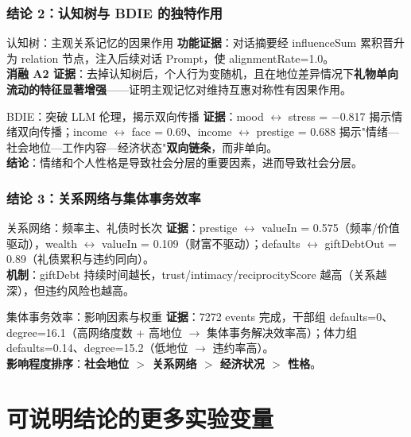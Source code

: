 \documentclass[AutoFakeBold,AutoFakeSlant]{beamer}
\begin{document}
\begin{frame}
    \frametitle{结论 2：认知树与 BDIE 的独特作用}
    \small
    \begin{block}{认知树：主观关系记忆的因果作用}
        \textbf{功能证据}：对话摘要经 influenceSum 累积晋升为 relation 节点，注入后续对话 Prompt，使 alignmentRate=1.0。\\
        \textbf{消融 A2 证据}：去掉认知树后，个人行为变随机，且在地位差异情况下\textbf{礼物单向流动的特征显著增强}——证明主观记忆对维持互惠对称性有因果作用。
    \end{block}
    \begin{block}{BDIE：突破 LLM 伦理，揭示双向传播}
        \textbf{证据}：mood $\leftrightarrow$ stress = $-$0.817 揭示情绪双向传播；income $\leftrightarrow$ face = 0.69、income $\leftrightarrow$ prestige = 0.688 揭示"情绪—社会地位—工作内容—经济状态"\textbf{双向链条}，而非单向。\\
        \textbf{结论}：情绪和个人性格是导致社会分层的重要因素，进而导致社会分层。
    \end{block}
\end{frame}

\begin{frame}
    \frametitle{结论 3：关系网络与集体事务效率}
    \small
    \begin{block}{关系网络：频率主、礼债时长次}
        \textbf{证据}：prestige $\leftrightarrow$ valueIn = 0.575（频率/价值驱动），wealth $\leftrightarrow$ valueIn = 0.109（财富不驱动）；defaults $\leftrightarrow$ giftDebtOut = 0.89（礼债累积与违约同向）。\\
        \textbf{机制}：giftDebt 持续时间越长，trust/intimacy/reciprocityScore 越高（关系越深），但违约风险也越高。
    \end{block}
    \begin{block}{集体事务效率：影响因素与权重}
        \textbf{证据}：7272 events 完成，干部组 defaults=0、degree=16.1（高网络度数 + 高地位 $\to$ 集体事务解决效率高）；体力组 defaults=0.14、degree=15.2（低地位 $\to$ 违约率高）。\\
        \textbf{影响程度排序}：\textbf{社会地位 $>$ 关系网络 $>$ 经济状况 $>$ 性格}。
    \end{block}
\end{frame}

\section{可说明结论的更多实验变量}
\end{document}
